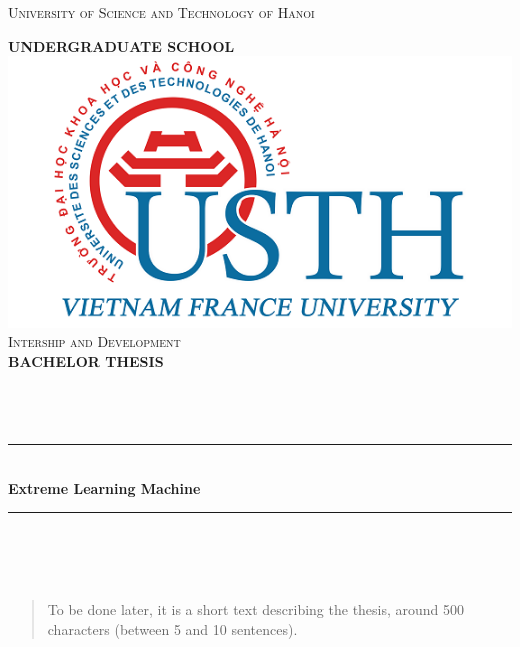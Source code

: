 \documentclass[11pt]{article}
\begin{document}
\begin{titlepage}
\centering
\textsc{\large University of Science and Technology of Hanoi} %

\textsc{\large \textbf{UNDERGRADUATE SCHOOL}}\\[1.0cm] %

\includegraphics[scale = 0.5]{usthlogo}\\[0.5 cm]	%

\textsc{\large Intership and Development}\\[0.5cm] %
\textsc{\huge \textbf{BACHELOR THESIS}}\\[0.5cm] 

\\[0.25cm] %
\\[0.25cm] %
\\[0.5cm] %

\rule{\linewidth}{0.2 mm} \\[0.4 cm]
{ \huge \bfseries Extreme Learning Machine}\\[0.4cm] %
\rule{\linewidth}{0.2 mm} \\[0.5 cm]

\\[0.25cm] %
\\[0.25cm] %

\end{titlepage}
    

\begin{abstract}
To be done later, it is a short text describing the thesis, around 500 characters (between 5 and 10 sentences).
\end{abstract}
\newpage
\end{document}
